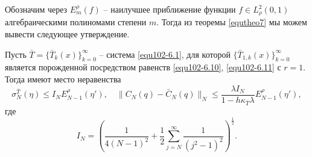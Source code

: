 Обозначим через $E^\rho_ m(f)$ -- наилучшее приближение функции $f\in L^2_\rho(0,1)$ алгебраическими полиномами степени $m$. Тогда из теоремы \ref{equtheo7} мы можем вывести следующее утверждение.
\begin{corollary}
  Пусть $\bar T=\{\bar T_k(x)\}_{k=0}^\infty$ -- система  \eqref{equ102-6.1}, для которой  $\{\bar T_{1,k}(x)\}_{k=0}^\infty$  является порожденной посредством равенств \eqref{equ102-6.10}, \eqref{equ102-6.11} с $r=1$. Тогда   имеют место неравенства
$$
\sigma^{\bar T}_N(\eta)\le I_NE^\rho_ {N-1}(\eta'),\quad\|C_N(q)-\bar C_N(q)\|_N\le \frac{\lambda I_N}{1-h\kappa_{\bar T}\lambda}E^\rho_ {N-1}(\eta'),
$$
где
$$
I_N=\left(\frac{1}{4(N-1)^2}+\frac12\sum_{j=N}^{\infty}\frac{1}{(j^2-1)^2}\right)^\frac12.
 $$
\end{corollary}
%









